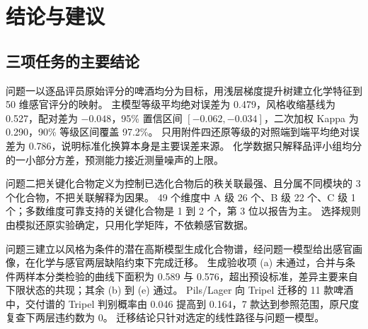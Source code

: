 \section{结论与建议}

\subsection{三项任务的主要结论}

问题一以逐品评员原始评分的啤酒均分为目标，用浅层梯度提升树建立化学特征到 50 维感官评分的映射。
主模型等级平均绝对误差为 0.479，风格收缩基线为 0.527，配对差为 $-0.048$，95\% 置信区间 $[-0.062,-0.034]$，二次加权 Kappa 为 0.290，90\% 等级区间覆盖 97.2\%。
只用附件四还原等级的对照端到端平均绝对误差为 0.786，说明标准化换算本身是主要误差来源。
化学数据只解释品评小组均分的一小部分方差，预测能力接近测量噪声的上限。

问题二把关键化合物定义为控制已选化合物后的秩关联最强、且分属不同模块的 3 个化合物，不把关联解释为因果。
49 个维度中 A 级 26 个、B 级 22 个、C 级 1 个；多数维度可靠支持的关键化合物是 1 到 2 个，第 3 位以报告为主。
选择规则由模拟还原实验确定，只用化学矩阵，不依赖感官数据。

问题三建立以风格为条件的潜在高斯模型生成化合物谱，经问题一模型给出感官画像，在化学与感官两层缺陷约束下完成迁移。
生成验收项 (a) 未通过，合并与条件两样本分类检验的曲线下面积为 0.589 与 0.576，超出预设标准，差异主要来自下限状态的共现；其余 (b) 到 (e) 通过。
Pils/Lager 向 Tripel 迁移的 11 款啤酒中，交付谱的 Tripel 判别概率由 0.046 提高到 0.164，7 款达到参照范围，原尺度复查下两层违约数为 0。
迁移结论只针对选定的线性路径与问题一模型。

